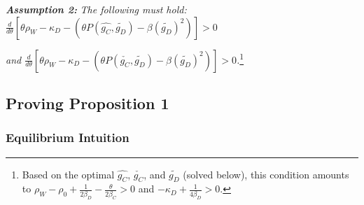 \documentclass[
]{article}
\begin{document}
\textbf{\textit{ Assumption 2:}}\textit{ The following must hold: $\frac{d}{d\theta}\left[\theta\rho_{W}-\kappa_{D}-\left(\theta P(\hat{g_{C}},\tilde{g_{D}})-\beta(\tilde{g_{D}})^{2}\right)\right]>0$ }

\textit{ and $\frac{d}{d\theta}\left[\theta\rho_{W}-\kappa_{D}-\left(\theta P(\check{g_{C}},\tilde{g_{D}})-\beta(\tilde{g_{D}})^{2}\right)\right]>0$.}\footnote{Based on the optimal $\hat{g_{C}}$, $\check{g_{C}}$, and $\tilde{g_{D}}$ (solved below), this condition amounts to $\rho_{W}-\rho_{0}+\frac{1}{2\beta_{D}}-\frac{\theta}{2\beta_{C}}>0$ and $-\kappa_{D}+\frac{1}{4\beta_{D}}>0$. }

\hypertarget{proving-proposition-1}{%
\subsection{Proving Proposition 1}\label{proving-proposition-1}}

\hypertarget{equilibrium-intuition}{%
\subsubsection{Equilibrium Intuition}\label{equilibrium-intuition}}
\end{document}
